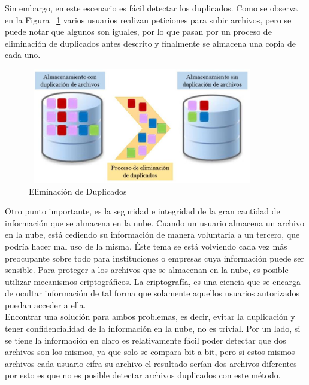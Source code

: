 Sin embargo, en este escenario es f\'acil detectar los duplicados. Como se observa en la Figura ~\ref{fig:1-1-3} varios usuarios realizan peticiones para subir archivos, pero se puede notar que algunos son iguales, por lo que pasan por un proceso de eliminación de duplicados antes descrito y finalmente se almacena una copia de cada uno. \\

\begin{figure}[H]
\centering
\includegraphics[width=10cm, height=5cm]{./images/Deduplicacion.jpg}
\caption{Eliminación de Duplicados}
\label{fig:1-1-3}
\end{figure}


Otro punto importante, es la seguridad e integridad de la gran cantidad de información que se almacena en la nube. Cuando un usuario almacena un archivo en la nube, est\'a cediendo su informaci\'on de manera voluntaria a un tercero, que podr\'ia hacer mal uso de la misma. Éste tema se está volviendo cada vez más preocupante sobre todo para instituciones o empresas cuya información puede ser sensible. Para proteger a los archivos que se almacenan en la nube, es posible utilizar mecanismos criptogr\'aficos. La criptografía, es una ciencia que se encarga de ocultar información de tal forma que solamente aquellos usuarios autorizados puedan acceder a ella. \\

Encontrar una soluci\'on para ambos problemas, es decir, evitar la duplicaci\'on y tener confidencialidad de la informaci\'on en la nube, no es trivial. Por un lado, si se tiene la información en claro es relativamente fácil poder detectar que dos archivos son los mismos, ya que solo se compara bit a bit, pero si estos mismos archivos cada usuario cifra su archivo el resultado serían dos archivos diferentes por esto es que no es posible detectar archivos duplicados con este método. 


